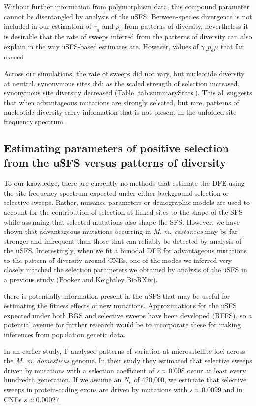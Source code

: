 \documentclass[11pt]{article}
\begin{document}
	Without further information from polymorphism data, this compound parameter cannot be disentangled by analysis of the uSFS. Between-species divergence is not included in our estimation of $\gamma_a$ and $p_a$ from patterns of diversity, nevertheless it is desirable that the rate of sweeps inferred from the patterns of diversity can also explain 
	 in the way uSFS-based estimates are. However, values of $\gamma_a p_a \mu$ that far exceed 
	
	Across our simulations, the rate of sweeps did not vary, but nucleotide diversity at neutral, synonymous sites did; as the scaled strength of selection increased, synonymous site diversity decreased (Table \ref{tab:summaryStats}). This all suggests that when advantageous mutations are strongly selected, but rare, patterns of nucleotide diversity carry information that is not present in the unfolded site frequency spectrum.

\subsection*{Estimating parameters of positive selection from the uSFS versus patterns of diversity}

To our knowledge, there are currently no methods that estimate the DFE using the site frequency spectrum expected under either background selection or selective sweeps. Rather, nuisance parameters or demographic models are used to account for the contribution of selection at linked sites to the shape of the SFS while assuming that selected mutations also shape the SFS. 
However, we have shown that advantageous mutations occurring in \textit{M. m. castaneus} may be far stronger and infrequent than those that can reliably be detected by analysis of the uSFS. Interestingly, when we fit a bimodal DFE for advantageous mutations to the pattern of diversity around CNEs, one of the modes we inferred very closely matched the selection parameters we obtained by analysis of the uSFS in a previous study (Booker and Keightley BioRXiv).

there is potentially information present in the uSFS that may be useful for estimating the fitness effects of new mutations. Approximations for the uSFS expected under both BGS and selective sweeps have been developed (REFS), so a potential avenue for further research would be to incorporate these for making inferences from population genetic data.

In an earlier study, T\cite{RN355} analysed patterns of variation at microsatellite loci across the \textit{M. m. domesticus} genome. In their study they estimated that selective sweeps driven by mutations with a selection coefficient of $s \approx 0.008$ occur at least every hundredth generation. If we assume an $N_e$ of 420,000, we estimate that selective sweeps in protein-coding exons are driven by mutations with $s \approx 0.0099$ and in CNEs $s \approx 0.00027$.
\end{document}

